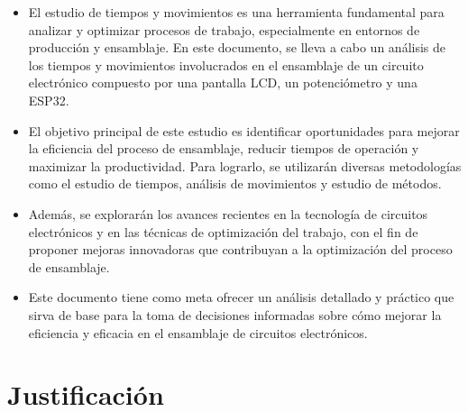     \begin{itemize}
    
     \item El estudio de tiempos y movimientos es una herramienta fundamental para analizar y optimizar procesos de trabajo, especialmente en entornos de producción y ensamblaje. En este documento, se lleva a cabo un análisis de los tiempos y movimientos involucrados en el ensamblaje de un circuito electrónico compuesto por una pantalla LCD, un potenciómetro y una ESP32.
    
     \item El objetivo principal de este estudio es identificar oportunidades para mejorar la eficiencia del proceso de ensamblaje, reducir tiempos de operación y maximizar la productividad. Para lograrlo, se utilizarán diversas metodologías como el estudio de tiempos, análisis de movimientos y estudio de métodos.
    
     \item Además, se explorarán los avances recientes en la tecnología de circuitos electrónicos y en las técnicas de optimización del trabajo, con el fin de proponer mejoras innovadoras que contribuyan a la optimización del proceso de ensamblaje.
    
     \item Este documento tiene como meta ofrecer un análisis detallado y práctico que sirva de base para la toma de decisiones informadas sobre cómo mejorar la eficiencia y eficacia en el ensamblaje de circuitos electrónicos.
    
    
    \end{itemize}
    \section{Justificación}
    
